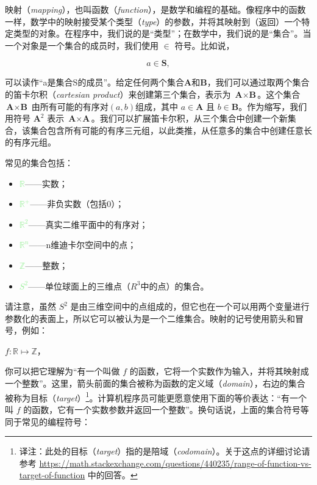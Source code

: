 \documentclass[lang=cn,12pt]{elegantbook}
\begin{document}
映射（\textit{mapping}），也叫函数（\textit{function}），是数学和编程的基础。像程序中的函数一样，数学中的映射接受某个类型（\textit{type}）的参数，并将其映射到（返回）一个特定类型的对象。在程序中，我们说的是“类型”；在数学中，我们说的是“集合”。当一个对象是一个集合的成员时，我们使用 $\in$ 符号。比如说，

$$a \in \textbf{S},$$ 

可以读作“a是集合S的成员”。给定任何两个集合$\textbf{A}$和$\textbf{B}$，我们可以通过取两个集合的笛卡尔积（\textit{cartesian product}）来创建第三个集合，表示为 $\textbf{A} \times \textbf{B}$。这个集合 $\textbf{A} \times \textbf{B}$ 由所有可能的有序对$(a,b)$组成，其中 $a \in \textbf{A}$ 且 $b \in \textbf{B}$。作为缩写，我们用符号 $\textbf{A}^2$ 表示 $\textbf{A} \times \textbf{A}$。我们可以扩展笛卡尔积，从三个集合中创建一个新集合，该集合包含所有可能的有序三元组，以此类推，从任意多的集合中创建任意长的有序元组。

常见的集合包括：

\begin{itemize}
  \item \textcolor{lightgreen}{$\mathbb{R}$}——实数；
  \item \textcolor{lightgreen}{$\mathbb{R^+}$}——非负实数（包括0）；
  \item \textcolor{lightgreen}{$\mathbb{R}^2$}——真实二维平面中的有序对；
  \item \textcolor{lightgreen}{$\mathbb{R}^n$}——n维迪卡尔空间中的点；
  \item \textcolor{lightgreen}{$\mathbb{Z}$}——整数；
  \item \textcolor{lightgreen}{$S^2$}——单位球面上的三维点（$R^3$中的点）的集合。
\end{itemize}

请注意，虽然 $S^2$ 是由三维空间中的点组成的，但它也在一个可以用两个变量进行参数化的表面上，所以它可以被认为是一个二维集合。映射的记号使用箭头和冒号，例如：

\begin{center}
  $f : \mathbb{R} \mapsto \mathbb{Z}$，
\end{center}

你可以把它理解为“有一个叫做 $f$ 的函数，它将一个实数作为输入，并将其映射成一个整数”。这里，箭头前面的集合被称为函数的定义域（\textit{domain}），右边的集合被称为目标（\textit{target}）\footnote[1]{译注：此处的目标（\textit{target}）指的是陪域（\textit{codomain}）。关于这点的详细讨论请参考 \url{https://math.stackexchange.com/questions/440235/range-of-function-vs-target-of-function} 中的回答。}。计算机程序员可能更愿意使用下面的等价表达：“有一个叫 $f$ 的函数，它有一个实数参数并返回一个整数”。换句话说，上面的集合符号等同于常见的编程符号：
\end{document}
